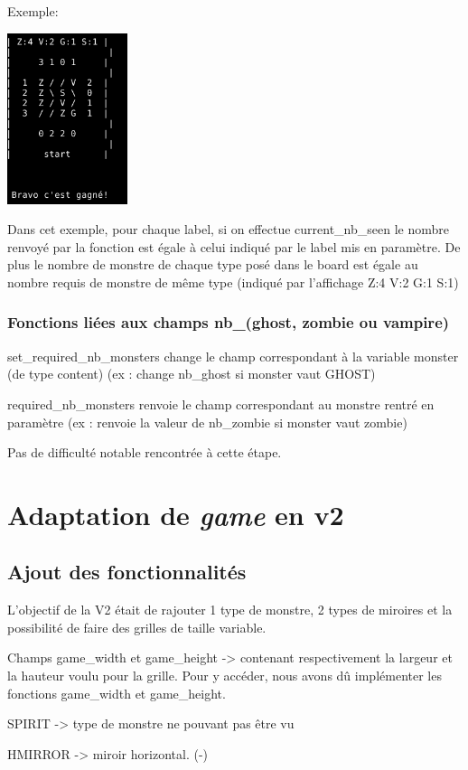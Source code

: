 \documentclass[12]{article}
\begin{document}
  Exemple:

  \includegraphics[height=5cm]{ex_is_game_over}

  Dans cet exemple, pour chaque label, si on effectue current\_nb\_seen le nombre renvoyé par la fonction est égale à celui indiqué par le label mis en paramètre. De plus le nombre de monstre de chaque type posé dans le board est égale au nombre requis de monstre de même type (indiqué par l'affichage Z:4 V:2 G:1 S:1) 
 \subsubsection{ Fonctions liées aux champs nb\_(ghost, zombie ou vampire)}
 set\_required\_nb\_monsters change le champ correspondant à la variable monster (de type content) (ex : change nb\_ghost si monster vaut GHOST)
 
 required\_nb\_monsters renvoie le champ correspondant au monstre rentré en paramètre (ex : renvoie la valeur de nb\_zombie si monster vaut zombie)


 Pas de difficulté notable rencontrée à cette étape.
\section{Adaptation de \textit{game} en v2}

\subsection{Ajout des fonctionnalités}
L'objectif de la V2 était de rajouter 1 type de monstre, 2 types de miroires et la possibilité de faire des grilles de taille variable.

Champs game\_width et game\_height -> contenant respectivement la largeur et la hauteur voulu pour la grille. Pour y accéder, nous avons dû implémenter les fonctions game\_width et game\_height.

SPIRIT -> type de monstre ne pouvant pas être vu

HMIRROR -> miroir horizontal. (-)
\end{document}
